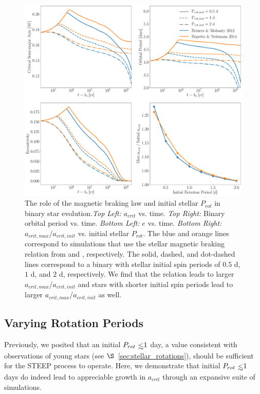 \begin{figure}[t]
	\includegraphics[width=\textwidth]{var_MB.pdf}
   \caption{The role of the magnetic braking law and initial stellar $P_{rot}$ in binary star evolution.{\it Top Left:} $a_{crit}$ vs. time.  {\it Top Right:} Binary orbital period vs. time. {\it Bottom Left:} $e$ vs. time. {\it Bottom Right:} $a_{crit,max}$/$a_{crit,init}$ vs. initial stellar $P_{rot}$.  The blue and orange lines correspond to simulations that use the stellar magnetic braking relation from \citet{Reiners2012} and \citet{Repetto2014}, respectively.  The solid, dashed, and dot-dashed lines correspond to a binary with stellar initial spin periods of $0.5$ d, $1$ d, and $2$ d, respectively.  We find that the \citet{Repetto2014} relation leads to larger $a_{crit,max}$/$a_{crit,init}$ and stars with shorter initial spin periods lead to larger $a_{crit,max}$/$a_{crit,init}$ as well.}
    \label{fig:var_mb}
\end{figure}

\subsection{Varying Rotation Periods} \label{sec:var_rot}

Previously, we posited that an initial $P_{rot} \lsim 1$ day, a value consistent with observations of young stars (see $\S$~\ref{sec:stellar_rotations}), should be sufficient for the STEEP process to operate.  Here, we demonstrate that initial $P_{rot} \lsim 1$ days do indeed lead to appreciable growth in $a_{crit}$ through an expansive suite of simulations.

